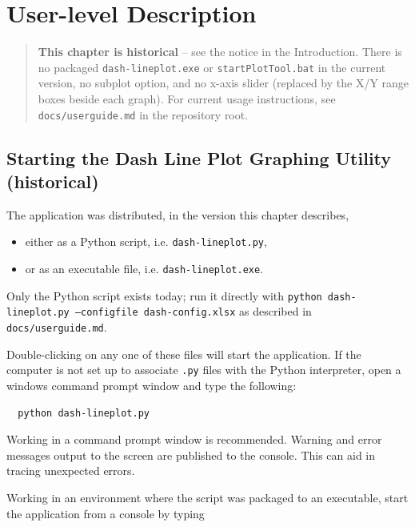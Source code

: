 

\chapter{User-level Description}

\begin{quotation}
\noindent\textbf{This chapter is historical} -- see the notice in the
Introduction. There is no packaged \texttt{dash-lineplot.exe} or
\texttt{startPlotTool.bat} in the current version, no subplot option, and
no x-axis slider (replaced by the X/Y range boxes beside each graph). For
current usage instructions, see \texttt{docs/userguide.md} in the
repository root.
\end{quotation}

\label{chap:userLevelDescription}
\section{Starting the Dash Line Plot Graphing Utility (historical)}


The application was distributed, in the version this chapter describes,

\begin{itemize}
  \item either as a Python script, i.e. \texttt{dash-lineplot.py},
  \item or as an executable file, i.e. \texttt{dash-lineplot.exe}.
\end{itemize}

Only the Python script exists today; run it directly with
\texttt{python dash-lineplot.py --configfile dash-config.xlsx} as described
in \texttt{docs/userguide.md}.

Double-clicking on any one of these files will start the application.
If the computer is not set up to associate \texttt{.py} files with the Python interpreter, open a windows command prompt window and type the following:

\footnotesize
\begin{lstlisting}
  python dash-lineplot.py
\end{lstlisting}
\normalsize

Working in a command prompt window is recommended. Warning and error messages output to the screen are published to the console. This can aid in tracing unexpected errors.

Working in an environment where the script was packaged to an executable, start the application from a console by typing


